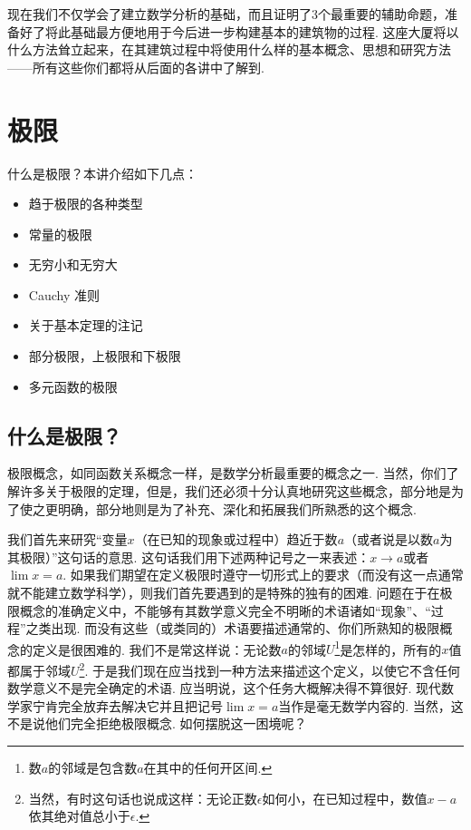 \documentclass[color=cyan,mathpazo,titlestyle=hang]{elegantbook_mac}
\begin{document}
现在我们不仅学会了建立数学分析的基础，而且证明了3个最重要的辅助命题，准备好了将此基础最方便地用于今后进一步构建基本的建筑物的过程. 这座大厦将以什么方法耸立起来，在其建筑过程中将使用什么样的基本概念、思想和研究方法——所有这些你们都将从后面的各讲中了解到. 

\chapter{极限}

什么是极限？本讲介绍如下几点：


\begin{itemize}

	\item 趋于极限的各种类型

	\item 常量的极限

	\item 无穷小和无穷大

	\item Cauchy 准则

	\item 关于基本定理的注记

	\item 部分极限，上极限和下极限

	\item 多元函数的极限

\end{itemize}

\section{什么是极限？} 

极限概念，如同函数关系概念一样，是数学分析最重要的概念之一. 当然，你们了解许多关于极限的定理，但是，我们还必须十分认真地研究这些概念，部分地是为了使之更明确，部分地则是为了补充、深化和拓展我们所熟悉的这个概念. 

我们首先来研究``变量$x$（在已知的现象或过程中）趋近于数$a$（或者说是以数$a$为其极限）''这句话的意思. 这句话我们用下述两种记号之一来表述：$x\to a$或者$\lim x = a$. 如果我们期望在定义极限时遵守一切形式上的要求（而没有这一点通常就不能建立数学科学），则我们首先要遇到的是特殊的独有的困难. 问题在于在极限概念的准确定义中，不能够有其数学意义完全不明晰的术语诸如``现象''、``过程''之类出现. 而没有这些（或类同的）术语要描述通常的、你们所熟知的极限概念的定义是很困难的. 我们不是常这样说：无论数$a$的邻域$U$\footnote{数$a$的邻域是包含数$a$在其中的任何开区间. }是怎样的，所有的$x$值都属于邻域$U$\footnote{当然，有时这句话也说成这样：无论正数$\epsilon$如何小，在已知过程中，数值$x-a$依其绝对值总小于$\epsilon$.}. 于是我们现在应当找到一种方法来描述这个定义，以使它不含任何数学意义不是完全确定的术语. 应当明说，这个任务大概解决得不算很好. 现代数学家宁肯完全放弃去解决它并且把记号$\lim x = a$当作是毫无数学内容的. 当然，这不是说他们完全拒绝极限概念. 如何摆脱这一困境呢？
\end{document}
